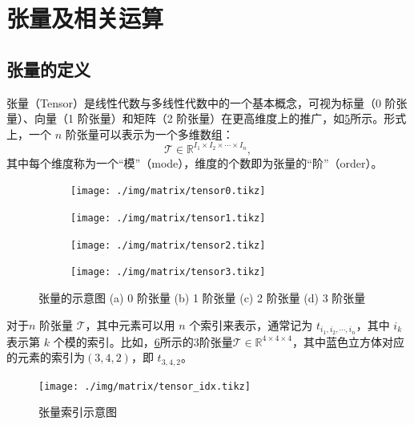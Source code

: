 \section{张量及相关运算}

\subsection{张量的定义}


张量（Tensor）是线性代数与多线性代数中的一个基本概念，可视为标量（0 阶张量）、向量（1 阶张量）和矩阵（2 阶张量）在更高维度上的推广，如\cref{fig_tensor}所示。形式上，一个 $n$ 阶张量可以表示为一个多维数组：
\[
    \mathcal{T} \in \mathbb{R}^{I_1 \times I_2 \times \cdots \times I_n},
\]
其中每个维度称为一个“模”（mode），维度的个数即为张量的“阶”（order）。

\begin{figure}[htb!]
    \centering
    \begin{subfigure}{.1\textwidth}
        \centering
        \texttt{[image: ./img/matrix/tensor0.tikz]}
        \caption{}
        \label{fig_tensor_1}
    \end{subfigure}
    \begin{subfigure}{.23\textwidth}
        \centering
        \texttt{[image: ./img/matrix/tensor1.tikz]}
        \caption{}
        \label{fig_tensor_2}
    \end{subfigure}
    \begin{subfigure}{.23\textwidth}
        \centering
        \texttt{[image: ./img/matrix/tensor2.tikz]}
        \caption{}
        \label{fig_tensor_3}
    \end{subfigure}
    \begin{subfigure}{.23\textwidth}
        \centering
        \texttt{[image: ./img/matrix/tensor3.tikz]}
        \caption{}
        \label{fig_tensor_4}
    \end{subfigure}
    \caption{张量的示意图 (a) 0 阶张量 (b) 1 阶张量 (c) 2 阶张量 (d) 3 阶张量}
    \label{fig_tensor}
\end{figure}

对于$n$ 阶张量 $\mathcal{T}$，其中元素可以用 $n$ 个索引来表示，通常记为 $t_{i_1, i_2, \cdots, i_n}$，其中 $i_k$ 表示第 $k$ 个模的索引。比如，\cref{fig_tensor_idx}所示的3阶张量\( \mathcal{T} \in \mathbb{R}^{4 \times 4 \times 4} \)，其中蓝色立方体对应的元素的索引为\( (3, 4, 2) \)，即 \( t_{3,4,2} \)。

\begin{figure}[htb!]
    \centering
    \texttt{[image: ./img/matrix/tensor\_idx.tikz]}
    \caption{张量索引示意图}
    \label{fig_tensor_idx}
\end{figure}

